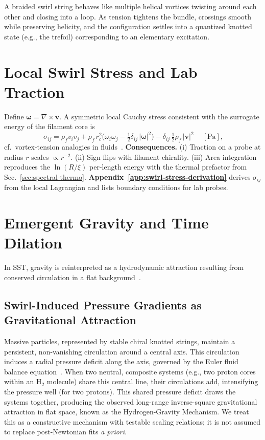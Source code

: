 \documentclass[10pt,reprint,aps,onecolumn,nofootinbib]{revtex4-2}
\begin{document}
        \begin{tcolorbox}[colframe=gray,title={Physical Picture}]
            A braided swirl string behaves like multiple helical vortices twisting around each other and closing into a loop. As tension tightens the bundle, crossings smooth while preserving helicity, and the configuration settles into a quantized knotted state (e.g., the trefoil) corresponding to an elementary excitation.
        \end{tcolorbox}

\section{Local Swirl Stress and Lab Traction}\label{sec:swirl-stress}
    Define \(\boldsymbol{\omega}=\nabla\times\mathbf{v}\).
    A symmetric local Cauchy stress consistent with the surrogate energy of the filament core is
    \[
        \boxed{~
        \sigma_{ij}
            = \rho_{\!f} v_i v_j
            + \rho_{\!f}\,r_c^{2}\Big(\omega_i\omega_j-\tfrac12\delta_{ij}\,|\boldsymbol{\omega}|^{2}\Big)
            - \delta_{ij}\,\tfrac12 \rho_{\!f}\,|\mathbf{v}|^{2}
            ~} \quad [\mathrm{Pa}],
    \]
    cf.\ vortex-tension analogies in fluids~\cite{Saffman1992,Batchelor1967,LandauFM}.
    \textbf{Consequences.} (i) Traction on a probe at radius \(r\) scales \(\propto r^{-2}\).
    (ii) Sign flips with filament chirality.
    (iii) Area integration reproduces the \(\ln(R/\xi)\) per-length energy with the thermal prefactor from Sec.~\ref{sec:spectral-thermo}.
    \textbf{Appendix~\ref{app:swirl-stress-derivation}} derives \(\sigma_{ij}\) from the local Lagrangian and lists boundary conditions for lab probes.


\section{Emergent Gravity and Time Dilation}\label{sec:gravity}
In SST, gravity is reinterpreted as a hydrodynamic attraction resulting from conserved circulation in a flat background~\cite{chiralSwirl}.

    \subsection*{Swirl-Induced Pressure Gradients as Gravitational Attraction}
        Massive particles, represented by stable chiral knotted strings, maintain a persistent, non-vanishing circulation around a central axis. This circulation induces a radial pressure deficit along the axis, governed by the Euler fluid balance equation~\cite{sstCanon}. When two neutral, composite systems (e.g., two proton cores within an H$_2$ molecule) share this central line, their circulations add, intensifying the pressure well (for two protons). This shared pressure deficit draws the systems together, producing the observed long-range inverse-square gravitational attraction in flat space, known as the Hydrogen-Gravity Mechanism. We treat this as a constructive mechanism with testable scaling relations; it is not assumed to replace post-Newtonian fits \textit{a priori}.
\end{document}
